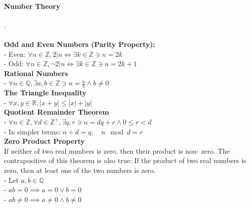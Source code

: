 \documentclass[10pt,letterpaper]{article}
\begin{document}
\newpage

\begin{multicols}{2}

\paragraph*{Number Theory}.\\\\
\textbf{Odd and Even Numbers (Parity Property):}\\
- Even: $\forall n \in \mathbb{Z}, 2|n \iff \exists k \in \mathbb{Z} \ni n = 2k$\\
- Odd: $\forall n \in \mathbb{Z}, \neg{2|n} \iff \exists k \in \mathbb{Z} \ni n = 2k + 1$\\
\textbf{Rational Numbers}\\
- $\forall n \in \mathbb{Q}, \exists a,b \in \mathbb{Z} \ni n = \frac{a}{b} \land b \neq 0$\\
\textbf{The Triangle Inequality}\\
- $\forall x,y \in \mathbb{R}, |x+y| \leq |x| + |y|$\\
\textbf{Quotient Remainder Theorem}\\
- $\forall n \in \mathbb{Z}, \forall d \in \mathbb{Z}^+, \exists q, r \ni n = dq + r \land 0 \leq r < d$\\
- In simpler terms: $n \div d = q, \quad n \mod d = r$\\
\textbf{Zero Product Property}\\
If neither of two real numbers is zero, then their product is non-
zero. The contrapositive of this theorem is also true: If the product of two
real numbers is zero, then at least one of the two numbers is zero.\\
- Let $a,b \in \mathbb{Q}$\\
- $ab = 0 \implies a = 0 \lor b = 0$\\
- $ab \neq 0 \implies a \neq 0 \land b \neq 0$


\end{multicols}
\end{document}
